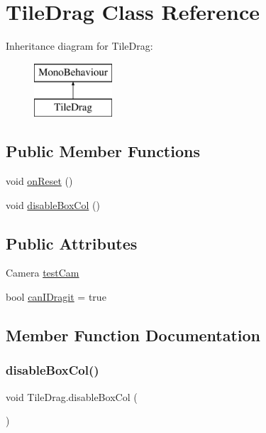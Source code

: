 \hypertarget{class_tile_drag}{}\section{Tile\+Drag Class Reference}
\label{class_tile_drag}
Inheritance diagram for Tile\+Drag\+:\begin{figure}[H]
\begin{center}
\leavevmode
\includegraphics[height=2.000000cm]{class_tile_drag}
\end{center}
\end{figure}
\subsection*{Public Member Functions}
\begin{DoxyCompactItemize}
\item 
void \hyperlink{class_tile_drag_a1e6de5920e24560c0e2dc78663d476de}{on\+Reset} ()
\item 
void \hyperlink{class_tile_drag_a2ac05ed0439d4c9467aef8a0304d5432}{disable\+Box\+Col} ()
\end{DoxyCompactItemize}
\subsection*{Public Attributes}
\begin{DoxyCompactItemize}
\item 
Camera \hyperlink{class_tile_drag_ade5547217c689f6d09d444bda707d1b3}{test\+Cam}
\item 
bool \hyperlink{class_tile_drag_a24edf4664b06aaffd113f728a57867e3}{can\+I\+Dragit} = true
\end{DoxyCompactItemize}


\subsection{Member Function Documentation}
\mbox{\label{class_tile_drag_a2ac05ed0439d4c9467aef8a0304d5432}} 
\subsubsection{\texorpdfstring{disable\+Box\+Col()}{disableBoxCol()}}
{\footnotesize\ttfamily void Tile\+Drag.\+disable\+Box\+Col (\begin{DoxyParamCaption}{ }\end{DoxyParamCaption})}

